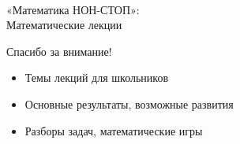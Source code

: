 \documentclass[17pt]{extarticle}
\begin{document}
\ \\ [1cm]

\begin{center} \Large «Математика НОН-СТОП»:\medskip \\
	Математические лекции \end{center}



\newpage \begin{center} \Large Спасибо за внимание! \end{center}

\begin{itemize}
	\item Темы лекций для школьников
	\item Основные результаты, возможные развития
	\item Разборы задач, математические игры
\end{itemize}
\end{document}
